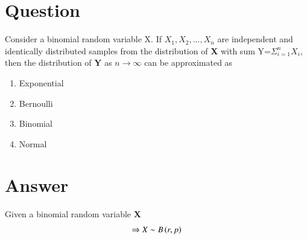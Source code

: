 \documentclass[journal,12pt,twocolumn]{IEEEtran}
\begin{document}
\section{Question}
 Consider a binomial random variable X. If \textbf{$X_1,X_2,...,X_n$} are independent and identically distributed samples from the distribution of \textbf{X} with sum Y=$\Sigma_{i=1}^n X_i$, then the distribution of \textbf{Y} as $n\rightarrow \infty$ can be approximated as
\begin{enumerate}
    \item Exponential
    \item Bernoulli 
    \item Binomial
    \item Normal
\end{enumerate}

\section{Answer}
Given a binomial random variable \textbf{X} 
\begin{align}
\Rightarrow X \sim B\left(r,p\right)
\end{align}
\end{document}
